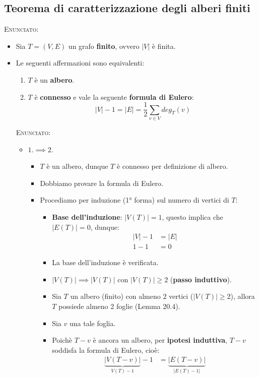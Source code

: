 \documentclass[10pt]{article}
\begin{document}
\subsection{Teorema di caratterizzazione degli alberi finiti}
\textsc{Enunciato:}
\begin{itemize}
\item
Sia $T=(V,E)$ un grafo \textbf{finito}, ovvero $|V|$ è finita.
\item
Le seguenti affermazioni sono equivalenti:
\begin{enumerate}
\item
$T$ è un \textbf{albero}.
\item
$T$ è \textbf{connesso} e vale la seguente \textbf{formula di Eulero}:
$$\displaystyle{|V| - 1 =  |E|  = \frac{1}{2} \sum_{v \in V} deg_T(v)}$$
\end{enumerate}
\textsc{Enunciato:}
\begin{itemize}
\item
$1. \implies 2.$
\begin{itemize}
\item
$T$ è un albero, dunque $T$ è connesso per definizione di albero.
\item
Dobbiamo provare la formula di Eulero.
\item
Procediamo per induzione (1° forma) sul numero di vertici di $T$:
\begin{itemize}
\item
\textbf{Base dell'induzione}: $|V(T)| = 1$, questo implica che $|E(T)| = 0$, dunque:
\begin{equation}
\begin{split}
|V| - 1 &= |E| \\
1 - 1 &= 0
\end{split}
\end{equation}
\item
La base dell'induzione è verificata.
\item
 $|V(T)| \implies |V(T)|$ con $|V(T)| \geq 2$ (\textbf{passo induttivo}).
\item
Sia $T$ un albero (finito) con almeno $2$ vertici ($|V(T)| \geq 2$), allora $T$ possiede almeno 2 foglie (Lemma 20.4).
\item
Sia $v$ una tale foglia.
\item
Poichè $T-v$ è ancora un albero, per \textbf{ipotesi induttiva}, $T-v$ soddisfa la formula di Eulero, cioè:
\begin{equation}
\begin{split}
\underbrace{|V(T-v)|}_{V(T)-1} - 1 &= \underbrace{|E(T-v)|}_{|E(T)-1|} \\

\end{split}
\end{equation}
\end{itemize}
\end{itemize}
\end{itemize}
\end{itemize}
\end{document}
